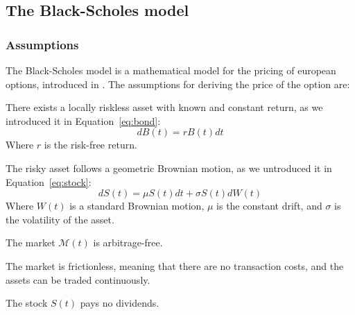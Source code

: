 





\subsection{The Black-Scholes model}
\subsubsection{Assumptions}
The Black-Scholes model is a mathematical model for the pricing of european options, introduced in \cite{black_scholes}. The assumptions for deriving the price of the option are:
\begin{assumption}
    There exists a locally riskless asset with known and constant return, as we introduced it in Equation~\ref{eq:bond}: 
        $$
            dB(t) = r B(t) dt
        $$
        Where $r$ is the risk-free return.
\end{assumption}

\begin{assumption}
    \label{ass:gbm}The risky asset follows a geometric Brownian motion, as we untroduced it in Equation~\ref{eq:stock}:
    $$
        dS(t) = \mu S(t) dt + \sigma S(t) dW(t)
    $$
    Where $W(t)$ is a standard Brownian motion, $\mu$ is the constant drift, and $\sigma$ is the volatility of the asset.
\end{assumption}

\begin{assumption}
    The market $\mathcal{M}(t)$ is arbitrage-free.
\end{assumption}

\begin{assumption}
    The market is frictionless, meaning that there are no transaction costs, and the assets can be traded continuously.
\end{assumption}

\begin{assumption}
    The stock $S(t)$ pays no dividends.
\end{assumption}

